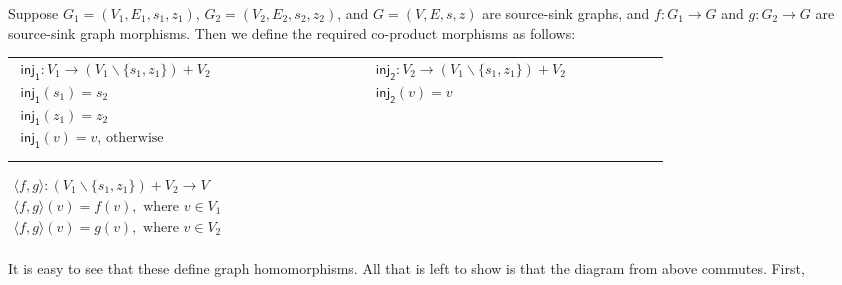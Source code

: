 Suppose $G_1 = (V_1 , E_1, s_1, z_1)$, $G_2 = (V_2 , E_2, s_2, z_2)$,
and $G = (V , E, s, z)$ are source-sink graphs, and $f : G_1 \to G$
and $g : G_2 \to G$ are source-sink graph morphisms.  Then we define
the required co-product morphisms as follows:
\begin{center}
  \begin{tabular}{llllllllllllllllll}
    \begin{math}
    \begin{array}{lll}
      \mathsf{inj_1} : V_1 \to (V_1 \mathop{\backslash} \{s_1,z_1\}) + V_2\\
      \mathsf{inj_1}(s_1) = s_2\\
      \mathsf{inj_1}(z_1) = z_2\\
      \mathsf{inj_1}(v) = v \text{, otherwise}\\
    \end{array}
    \end{math}
    & \quad & \quad & \quad & \quad &\quad &\quad &\quad &\quad &\quad &\quad &
    \begin{math}
    \begin{array}{lll}
      \mathsf{inj_2} : V_2 \to (V_1 \mathop{\backslash} \{s_1,z_1\}) + V_2\\
      \mathsf{inj_2}(v) = v\\
      \\
      \\
    \end{array}
  \end{math}
  \end{tabular}

  \vspace{10px}
  \begin{math}
    \begin{array}{lll}
      \langle f , g \rangle : (V_1 \mathop{\backslash} \{s_1,z_1\}) + V_2 \to V\\      
      \langle f , g \rangle(v) = f(v), \text{ where } v \in V_1\\
      \langle f , g \rangle(v) = g(v), \text{ where } v \in V_2\\
    \end{array}
  \end{math}
\end{center}
It is easy to see that these define graph homomorphisms.  All that is
left to show is that the diagram from above commutes.  First,
